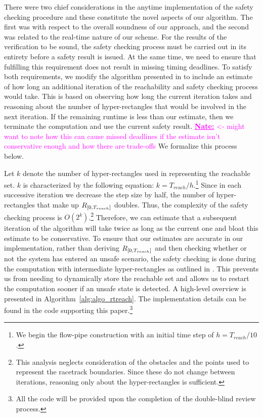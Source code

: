 \documentclass[manuscript,screen,review]{acmart}
\newcommand{\nate}[1]{\textcolor{magenta}{\textbf{\underline{Nate:}} #1}}
\begin{document}
There were two chief considerations in the anytime implementation of the safety checking procedure and these constitute the novel aspects of our algorithm. The first was with respect to the overall soundness of our approach, and the second was related to the real-time nature of our scheme. For the results of the verification to be sound, the safety checking process must be carried out in its entirety before a safety result is issued. At the same time, we need to ensure that fulfilling this requirement does not result in missing timing deadlines. To satisfy both requirements, we modify the algorithm presented in \cite{Bak2014} to include an estimate of how long an additional iteration of the reachability and safety checking process would take. This is based on observing how long the current iteration takes and reasoning about the number of hyper-rectangles that would be involved in the next iteration. If the remaining runtime is less than our estimate, then we terminate the computation and use the current safety result. \nate{<- might want to note how this can cause missed deadlines if the estimate isn't conservative enough and how there are trade-offs} We formalize this process below.

Let $k$ denote the number of hyper-rectangles used in representing the reachable set. $k$ is characterized by the following equation: $k = T_{reach} / h$.\footnote{We begin the flow-pipe construction with an initial time step of $h = T_{reach}/10$.} Since in each successive iteration we decrease the step size by half, the number of hyper-rectangles that make up $\mathnormal{R}_{[0,T_{reach}]}$ doubles. Thus, the complexity of the safety checking process is $O(2^k)$.\footnote{This analysis neglects consideration of the obstacles and the points used to represent the racetrack boundaries. Since these do not change between iterations, reasoning only about the hyper-rectangles is sufficient.} Therefore, we can estimate that a subsequent iteration of the algorithm will take twice as long as the current one and bloat this estimate to be conservative. To ensure that our estimates are accurate in our implementation, rather than deriving $\mathnormal{R}_{[0,T_{reach}]}$ and then checking whether or not the system has entered an unsafe scenario, the safety checking is done during the computation with intermediate hyper-rectangles as outlined in \cite{Bak2014}. This prevents us from needing to dynamically store the reachable set and allows us to restart the computation sooner if an unsafe state is detected. A high-level overview is presented in Algorithm~\ref{alg:algo_rtreach}. The implementation details can be found in the code supporting this paper.\footnote{All the code will be provided upon the completion of the double-blind review process.} 
\end{document}
